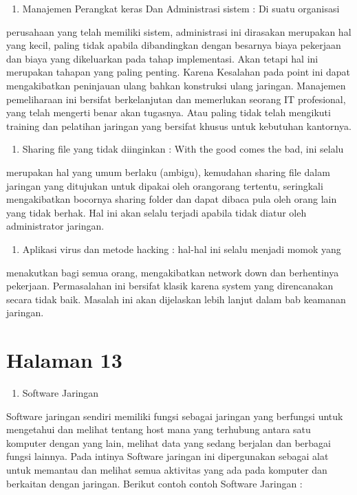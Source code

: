 \documentclass[11pt]{article}
\begin{document}
\begin{enumerate}
\item Manajemen Perangkat keras Dan Administrasi sistem : Di suatu organisasi
\end{enumerate}
perusahaan yang telah memiliki sistem, administrasi ini dirasakan merupakan
hal yang kecil, paling tidak apabila dibandingkan dengan besarnya biaya
pekerjaan dan biaya yang dikeluarkan pada tahap implementasi. Akan tetapi
hal ini merupakan tahapan yang paling penting. Karena Kesalahan pada point
ini dapat mengakibatkan peninjauan ulang bahkan konstruksi ulang jaringan.
Manajemen pemeliharaan ini bersifat berkelanjutan dan memerlukan seorang
IT profesional, yang telah mengerti benar akan tugasnya. Atau paling tidak
telah mengikuti training dan pelatihan jaringan yang bersifat khusus untuk
kebutuhan kantornya.
\begin{enumerate}
\item Sharing file yang tidak diinginkan : With the good comes the bad, ini selalu
\end{enumerate}
merupakan hal yang umum berlaku (ambigu), kemudahan sharing file dalam
jaringan yang ditujukan untuk dipakai oleh orangorang tertentu, seringkali
mengakibatkan bocornya sharing folder dan dapat dibaca pula oleh orang lain
yang tidak berhak. Hal ini akan selalu terjadi apabila tidak diatur oleh
administrator jaringan.

\begin{enumerate}
\item Aplikasi virus dan metode hacking : hal-hal ini selalu menjadi momok yang
\end{enumerate}
menakutkan bagi semua orang, mengakibatkan network down dan
berhentinya pekerjaan. Permasalahan ini bersifat klasik karena system yang
direncanakan secara tidak baik. Masalah ini akan dijelaskan lebih lanjut dalam
bab keamanan jaringan.

\section{Halaman 13}
\label{sec:org05cb505}

\begin{enumerate}
\item Software Jaringan
\end{enumerate}

Software jaringan sendiri memiliki fungsi sebagai jaringan yang berfungsi
untuk mengetahui dan melihat tentang host mana yang terhubung antara satu
komputer dengan yang lain, melihat data yang sedang berjalan dan berbagai
fungsi lainnya. Pada intinya Software jaringan ini dipergunakan sebagai alat
untuk memantau dan melihat semua aktivitas yang ada pada komputer dan
berkaitan dengan jaringan. Berikut contoh contoh Software Jaringan :
\end{document}

